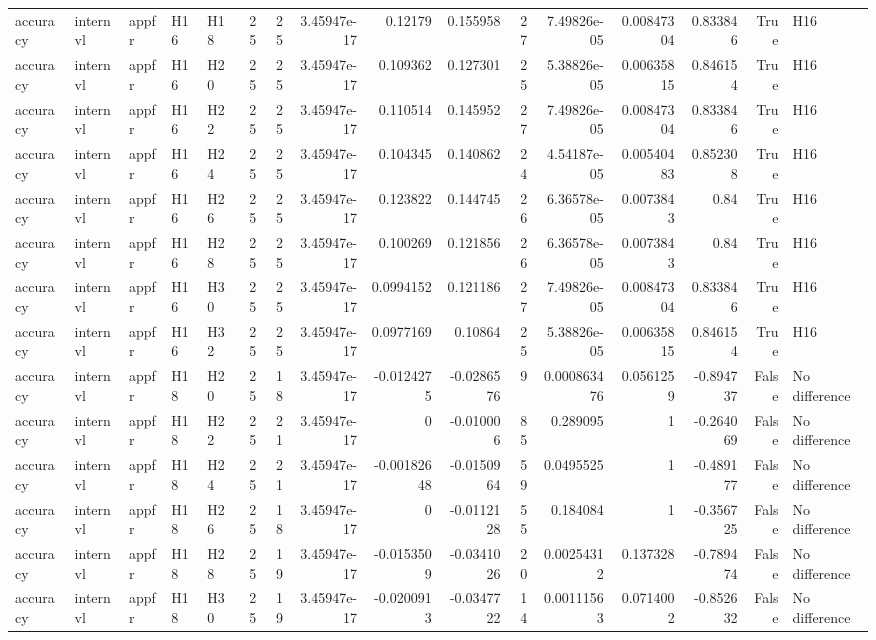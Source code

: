 \begin{longtable}{lllllrrrrrrrrrrl}
accuracy & internvl & appfr & H16 & H18 & 25 & 25 & 3.45947e-17 & 0.12179 & 0.155958 & 27 & 7.49826e-05 & 0.00847304 & 0.833846 & True & H16 \\
accuracy & internvl & appfr & H16 & H20 & 25 & 25 & 3.45947e-17 & 0.109362 & 0.127301 & 25 & 5.38826e-05 & 0.00635815 & 0.846154 & True & H16 \\
accuracy & internvl & appfr & H16 & H22 & 25 & 25 & 3.45947e-17 & 0.110514 & 0.145952 & 27 & 7.49826e-05 & 0.00847304 & 0.833846 & True & H16 \\
accuracy & internvl & appfr & H16 & H24 & 25 & 25 & 3.45947e-17 & 0.104345 & 0.140862 & 24 & 4.54187e-05 & 0.00540483 & 0.852308 & True & H16 \\
accuracy & internvl & appfr & H16 & H26 & 25 & 25 & 3.45947e-17 & 0.123822 & 0.144745 & 26 & 6.36578e-05 & 0.0073843 & 0.84 & True & H16 \\
accuracy & internvl & appfr & H16 & H28 & 25 & 25 & 3.45947e-17 & 0.100269 & 0.121856 & 26 & 6.36578e-05 & 0.0073843 & 0.84 & True & H16 \\
accuracy & internvl & appfr & H16 & H30 & 25 & 25 & 3.45947e-17 & 0.0994152 & 0.121186 & 27 & 7.49826e-05 & 0.00847304 & 0.833846 & True & H16 \\
accuracy & internvl & appfr & H16 & H32 & 25 & 25 & 3.45947e-17 & 0.0977169 & 0.10864 & 25 & 5.38826e-05 & 0.00635815 & 0.846154 & True & H16 \\
accuracy & internvl & appfr & H18 & H20 & 25 & 18 & 3.45947e-17 & -0.0124275 & -0.0286576 & 9 & 0.000863476 & 0.0561259 & -0.894737 & False & No difference \\
accuracy & internvl & appfr & H18 & H22 & 25 & 21 & 3.45947e-17 & 0 & -0.010006 & 85 & 0.289095 & 1 & -0.264069 & False & No difference \\
accuracy & internvl & appfr & H18 & H24 & 25 & 21 & 3.45947e-17 & -0.00182648 & -0.0150964 & 59 & 0.0495525 & 1 & -0.489177 & False & No difference \\
accuracy & internvl & appfr & H18 & H26 & 25 & 18 & 3.45947e-17 & 0 & -0.0112128 & 55 & 0.184084 & 1 & -0.356725 & False & No difference \\
accuracy & internvl & appfr & H18 & H28 & 25 & 19 & 3.45947e-17 & -0.0153509 & -0.0341026 & 20 & 0.00254312 & 0.137328 & -0.789474 & False & No difference \\
accuracy & internvl & appfr & H18 & H30 & 25 & 19 & 3.45947e-17 & -0.0200913 & -0.0347722 & 14 & 0.00111563 & 0.0714002 & -0.852632 & False & No difference \\

\end{longtable}
